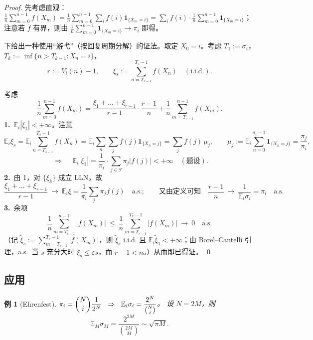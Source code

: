 \documentclass[lang=cn,10pt,newtx,thmcnt=chapter,mode=simple]{vividbook}
\providecommand{\E}{}\renewcommand{\E}{\mathbb{E}}
\newcommand{\ind}[1]{\mathbf{1}_{\{#1\}}}
\newcommand{\darr}{\;\Rightarrow\;}
\theoremstyle{vividthm}
\theoremstyle{vividdef}
\theoremstyle{vividexa}
\newtheorem*{vividexample}{例}
\theoremstyle{vividrem}
\newenvironment{example}[1][]{\begin{vividexample}[#1]}{\end{vividexample}}
\begin{document}
\begin{proof}
先考虑直观：$\frac1n\sum_{m=0}^{n-1}f(X_m)=\frac1n\sum_{m=0}^{n-1}\sum_i f(i)\ind{X_m=i}
=\sum_i f(i)\cdot\frac1n\sum_{m=0}^{n-1}\ind{X_m=i}$；注意若 $f$ 有界，则由
$\frac1n\sum_{m=0}^{n-1}\ind{X_m=i}\to\pi_i$ 即得。

下给出一种使用“游弋”（按回复周期分解）的证法。取定 $X_0=i$。考虑
$T_1:=\sigma_i$，$T_k:=\inf\{n>T_{k-1}:X_n=i\}$，
\[
r:=V_i(n)-1,\qquad
\xi_s:=\sum_{n=T_{s-1}}^{T_s-1}f(X_n)\quad(\text{i.i.d.}).
\]
\begin{center}
\end{center}
考虑
\[
\frac1n\sum_{m=0}^{n-1}f(X_m)
=\frac{\xi_1+\dots+\xi_{r-1}}{r-1}\cdot\frac{r-1}{n}
+\frac1n\sum_{m=T_{r-1}}^{n-1}f(X_m).
\]
\textbf{1.}\ $\E_i|\xi_1|<+\infty$。注意
\[
\E_i\xi_s=\E_i\sum_{n=T_{s-1}}^{T_s-1}f(X_n)
=\E_i\sum_n\sum_jf(j)\ind{X_n=j}
=\sum_jf(j)\,\mu_j,
\qquad
\mu_j:=\E_i\sum_{n=0}^{\sigma_i-1}\ind{X_n=j}=\frac{\pi_j}{\pi_i},
\]
\[
\darr\quad
\E_i|\xi_1|=\frac{1}{\pi_i}\cdot\sum_{j\in S}\pi_j|f(j)|<+\infty\quad(\text{题设}).
\]
\textbf{2.}\ 由 1，对 $\{\xi_k\}$ 成立 LLN，故
\[
\frac{\xi_1+\dots+\xi_{r-1}}{r-1}
\ \longrightarrow\ \E_i\xi=\frac{1}{\pi_i}\sum_j\pi_jf(j)
\quad\text{a.s.};
\qquad
\text{又由定义可知}\quad \frac{r-1}{n}\ \longrightarrow\ \frac{1}{\E_i\sigma_i}=\pi_i
\quad\text{a.s.}
\]
\textbf{3.}\ 余项
\[
\frac1n\sum_{m=T_{r-1}}^{n-1}\bigl|f(X_m)\bigr|
\ \le\ \frac1n\sum_{m=T_{r-1}}^{T_r-1}\bigl|f(X_m)\bigr|
\ \longrightarrow\ 0
\quad\text{a.s.}
\]
（记 $\widetilde{\xi}_s:=\sum_{m=T_{s-1}}^{T_s-1}|f(X_m)|$，则 $\widetilde{\xi}_s$ i.i.d. 且
$\E_i\widetilde{\xi}_1<+\infty$；由 Borel--Cantelli 引理，a.s.\ 当 $s$ 充分大时
$\widetilde{\xi}_s\le\varepsilon s$，而 $r-1<n$。）从而即已得证。 \qed
\end{proof}

\subsection{应用}

\begin{example}[Ehrenfest]
$\pi_i=\dbinom{N}{i}\dfrac{1}{2^N}\ \darr\ \E_i\sigma_i=\dfrac{2^N}{\binom{N}{i}}$。
设 $N=2M$，则
\[
\E_M\sigma_M=\frac{2^{2M}}{\binom{2M}{M}}\sim\sqrt{\pi M}.
\]
\begin{center}
\end{center}
\end{example}
\end{document}
